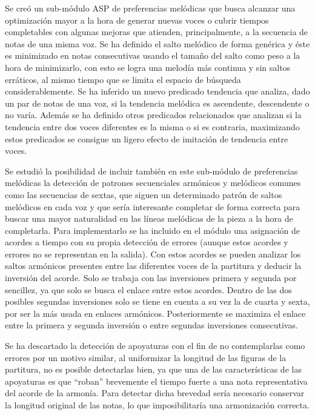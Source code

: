Se creó un sub-módulo ASP de preferencias melódicas que busca alcanzar una optimización mayor a la hora de generar nuevas voces o cubrir tiempos completables con algunas mejoras que atienden, principalmente, a la secuencia de notas de una misma voz. Se ha definido el salto melódico de forma genérica y éste es minimizado en notas consecutivas usando el tamaño del salto como peso a la hora de minimizarlo, con esto se logra una melodía más continua y sin saltos erráticos, al mismo tiempo que se limita el espacio de búsqueda considerablemente. Se ha inferido un nuevo predicado tendencia que analiza, dado un par de notas de una voz, si la tendencia melódica es ascendente, descendente o no varía. Además se ha definido otros predicados relacionados que analizan si la tendencia entre dos voces diferentes es la misma o si es contraria, maximizando estos predicados se consigue un ligero efecto de imitación de tendencia entre voces.

Se estudió la posibilidad de incluir también en este sub-módulo de preferencias melódicas la detección de patrones secuenciales armónicos y melódicos comunes como las secuencias de sextas, que siguen un determinado patrón de saltos melódicos en cada voz y que sería interesante completar de forma correcta para buscar una mayor naturalidad en las líneas melódicas de la pieza a la hora de completarla. Para implementarlo se ha incluido en el módulo una asignación de acordes a tiempo con su propia detección de errores (aunque estos acordes y errores no se representan en la salida). Con estos acordes se pueden analizar los saltos armónicos presentes entre las diferentes voces de la partitura y deducir la inversión del acorde. Solo se trabaja con las inversiones primera y segunda por sencillez, ya que solo se busca el enlace entre estos acordes. Dentro de las dos posibles segundas inversiones solo se tiene en cuenta a su vez la  de cuarta y sexta, por ser la más usada en enlaces armónicos. Posteriormente se maximiza el enlace entre la primera y segunda inversión o entre segundas inversiones consecutivas.

Se ha descartado la detección de apoyaturas con el fin de no contemplarlas como errores por un motivo similar, al uniformizar la longitud de las figuras de la partitura, no es posible detectarlas bien, ya que una de las características de las apoyaturas es que ``roban'' brevemente el tiempo fuerte a una nota representativa del acorde de la armonía. Para detectar dicha brevedad sería necesario conservar la longitud original de las notas, lo que imposibilitaría una armonización correcta.

